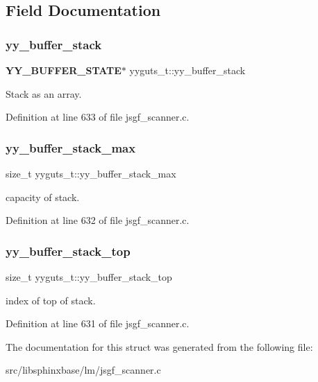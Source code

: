 \subsection{Field Documentation}
\mbox{\label{structyyguts__t_ad0b9d576189d518a4482f20ed9b2a416}} 
\subsubsection{yy\+\_\+buffer\+\_\+stack}
{\footnotesize\ttfamily \textbf{ Y\+Y\+\_\+\+B\+U\+F\+F\+E\+R\+\_\+\+S\+T\+A\+TE}$\ast$ yyguts\+\_\+t\+::yy\+\_\+buffer\+\_\+stack}



Stack as an array. 



Definition at line 633 of file jsgf\+\_\+scanner.\+c.

\mbox{\label{structyyguts__t_a4435bb91e87f9988b096afc21386289a}} 
\subsubsection{yy\+\_\+buffer\+\_\+stack\+\_\+max}
{\footnotesize\ttfamily size\+\_\+t yyguts\+\_\+t\+::yy\+\_\+buffer\+\_\+stack\+\_\+max}



capacity of stack. 



Definition at line 632 of file jsgf\+\_\+scanner.\+c.

\mbox{\label{structyyguts__t_af92507d904af2fcd4509acde654a9850}} 
\subsubsection{yy\+\_\+buffer\+\_\+stack\+\_\+top}
{\footnotesize\ttfamily size\+\_\+t yyguts\+\_\+t\+::yy\+\_\+buffer\+\_\+stack\+\_\+top}



index of top of stack. 



Definition at line 631 of file jsgf\+\_\+scanner.\+c.



The documentation for this struct was generated from the following file\+:\begin{DoxyCompactItemize}
\item 
src/libsphinxbase/lm/jsgf\+\_\+scanner.\+c\end{DoxyCompactItemize}

